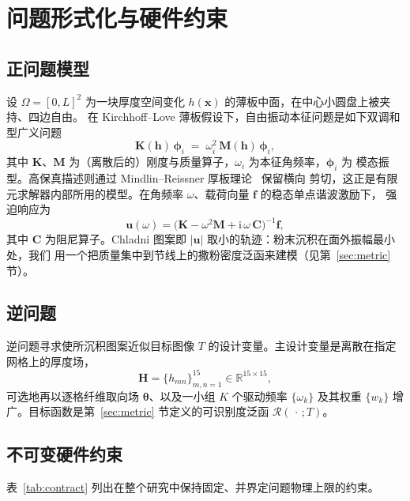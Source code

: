\documentclass[11pt,a4paper]{article}
\newcommand{\matH}{\mathbf{H}}
\newcommand{\matK}{\mathbf{K}}
\newcommand{\matM}{\mathbf{M}}
\begin{document}
\section{问题形式化与硬件约束}\label{sec:contract}

\subsection{正问题模型}
设 $\Omega=[0,L]^2$ 为一块厚度空间变化 $h(\bm{x})$ 的薄板中面，在中心小圆盘上被夹持、四边自由。
在 Kirchhoff--Love 薄板假设下，自由振动本征问题是如下双调和型广义问题
\begin{equation}
\matK(\bm{h})\,\bm{\phi}_i \;=\; \omega_i^2\,\matM(\bm{h})\,\bm{\phi}_i,
\label{eq:eig}
\end{equation}
其中 $\matK$、$\matM$ 为（离散后的）刚度与质量算子，$\omega_i$ 为本征角频率，$\bm{\phi}_i$ 为
模态振型。高保真描述则通过 Mindlin--Reissner 厚板理论~\cite{reissner1945,mindlin1951} 保留横向
剪切，这正是有限元求解器内部所用的模型。在角频率 $\omega$、载荷向量 $\bm{f}$ 的稳态单点谐波激励下，
强迫响应为
\begin{equation}
\bm{u}(\omega)=\big(\matK-\omega^2\matM + \mathrm{i}\,\omega\,\mathbf{C}\big)^{-1}\bm{f},
\label{eq:forced}
\end{equation}
其中 $\mathbf{C}$ 为阻尼算子。Chladni 图案即 $|\bm{u}|$ 取小的轨迹：粉末沉积在面外振幅最小处，我们
用一个把质量集中到节线上的撒粉密度泛函来建模（见第~\ref{sec:metric} 节）。

\subsection{逆问题}
逆问题寻求使所沉积图案近似目标图像 $T$ 的设计变量。主设计变量是离散在指定网格上的厚度场，
\begin{equation}
\matH=\{h_{mn}\}_{m,n=1}^{15}\in\mathbb{R}^{15\times15},
\end{equation}
可选地再以逐格纤维取向场 $\bm{\theta}$、以及一小组 $K$ 个驱动频率 $\{\omega_k\}$ 及其权重
$\{w_k\}$ 增广。目标函数是第~\ref{sec:metric} 节定义的可识别度泛函 $\mathcal{R}(\,\cdot\,;T)$。

\subsection{不可变硬件约束}
表~\ref{tab:contract} 列出在整个研究中保持固定、并界定问题物理上限的约束。
\end{document}
